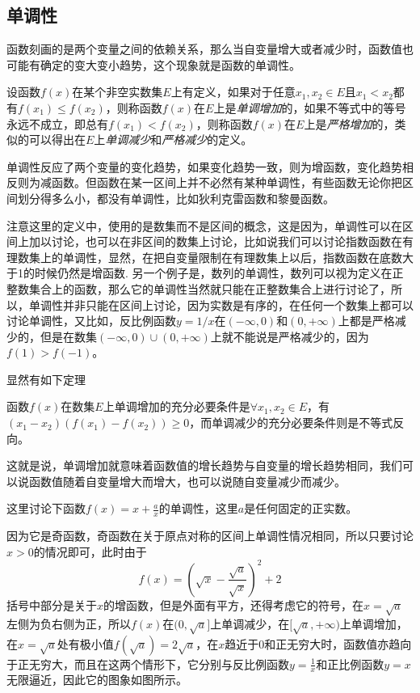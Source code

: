 \subsection{单调性}
\label{sec:monotonicity-of-function}

函数刻画的是两个变量之间的依赖关系，那么当自变量增大或者减少时，函数值也可能有确定的变大变小趋势，这个现象就是函数的单调性。

\begin{definition}
  设函数$f(x)$在某个非空实数集$E$上有定义，如果对于任意$x_1,x_2 \in E$且$x_1<x_2$都有$f(x_1) \leqslant f(x_2)$，则称函数$f(x)$在$E$上是\emph{单调增加}的，如果不等式中的等号永远不成立，即总有$f(x_1)<f(x_2)$，则称函数$f(x)$在$E$上是\emph{严格增加}的，类似的可以得出在$E$上\emph{单调减少}和\emph{严格减少}的定义。
\end{definition}

单调性反应了两个变量的变化趋势，如果变化趋势一致，则为增函数，变化趋势相反则为减函数。但函数在某一区间上并不必然有某种单调性，有些函数无论你把区间划分得多么小，都没有单调性，比如狄利克雷函数和黎曼函数。

注意这里的定义中，使用的是数集而不是区间的概念，这是因为，单调性可以在区间上加以讨论，也可以在非区间的数集上讨论，比如说我们可以讨论指数函数在有理数集上的单调性，显然，在把自变量限制在有理数集上以后，指数函数在底数大于1的时候仍然是增函数. 另一个例子是，数列的单调性，数列可以视为定义在正整数集合上的函数，那么它的单调性当然就只能在正整数集合上进行讨论了，所以，单调性并非只能在区间上讨论，因为实数是有序的，在任何一个数集上都可以讨论单调性，又比如，反比例函数$y=1/x$在$(-\infty,0)$和$(0,+\infty)$上都是严格减少的，但是在数集$(-\infty,0)\cup(0,+\infty)$上就不能说是严格减少的，因为$f(1)>f(-1)$。

显然有如下定理
\begin{theorem}
  \label{theorem:monotonicity-inequality}
  函数$f(x)$在数集$E$上单调增加的充分必要条件是$\forall x_1,x_2 \in E$，有$(x_1-x_2)(f(x_1)-f(x_2)) \geqslant 0$，而单调减少的充分必要条件则是不等式反向。
\end{theorem}

这就是说，单调增加就意味着函数值的增长趋势与自变量的增长趋势相同，我们可以说函数值随着自变量增大而增大，也可以说随自变量减少而减少。

\begin{example}
这里讨论下函数$f(x)=x+\frac{a}{x}$的单调性，这里$a$是任何固定的正实数。

因为它是奇函数，奇函数在关于原点对称的区间上单调性情况相同，所以只要讨论$x>0$的情况即可，此时由于
$$
f(x)=\left( \sqrt{x}-\frac{\sqrt{a}}{\sqrt{x}} \right)^2+2
$$
括号中部分是关于$x$的增函数，但是外面有平方，还得考虑它的符号，在$x=\sqrt{a}$左侧为负右侧为正，所以$f(x)$在$(0,\sqrt{a}]$上单调减少，在$[\sqrt{a},+\infty)$上单调增加，在$x=\sqrt{a}$处有极小值$f(\sqrt{a})=2\sqrt{a}$，在$x$趋近于0和正无穷大时，函数值亦趋向于正无穷大，而且在这两个情形下，它分别与反比例函数$y=\frac{1}{x}$和正比例函数$y=x$无限逼近，因此它的图象如图所示。
\end{example}

